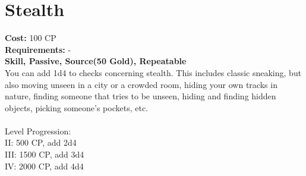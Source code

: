 \section{Stealth}
\textbf{Cost:} 100 CP\\
\textbf{Requirements:} -\\
\textbf{Skill, Passive, Source(50 Gold), Repeatable}\\
You can add 1d4 to checks concerning stealth. This includes classic sneaking, but also moving unseen in a city or a crowded room, hiding your own tracks in nature, finding someone that tries to be unseen, hiding and finding hidden objects, picking someone's pockets, etc.\\
\\
Level Progression:\\
II: 500 CP, add 2d4\\
III: 1500 CP, add 3d4\\
IV: 2000 CP, add 4d4\\